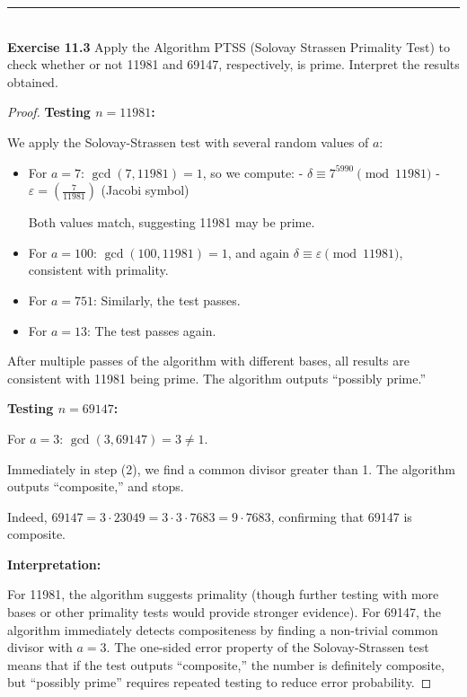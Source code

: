 \documentclass[a4paper]{article}
\begin{document}
\noindent\rule{12cm}{0.4pt}\\
\noindent \textbf{Exercise 11.3} Apply the Algorithm PTSS (Solovay Strassen Primality Test) to check whether or not 11981 and 69147, respectively, is prime. Interpret the results obtained.
\begin{proof}
\textbf{Testing $n = 11981$:}

We apply the Solovay-Strassen test with several random values of $a$:

\begin{itemize}
\item For $a = 7$: $\gcd(7, 11981) = 1$, so we compute:
  - $\delta \equiv 7^{5990} \pmod{11981}$
  - $\varepsilon = \left(\frac{7}{11981}\right)$ (Jacobi symbol)
  
  Both values match, suggesting 11981 may be prime.

\item For $a = 100$: $\gcd(100, 11981) = 1$, and again $\delta \equiv \varepsilon \pmod{11981}$, consistent with primality.

\item For $a = 751$: Similarly, the test passes.

\item For $a = 13$: The test passes again.
\end{itemize}

After multiple passes of the algorithm with different bases, all results are consistent with 11981 being prime. The algorithm outputs ``possibly prime.''

\textbf{Testing $n = 69147$:}

For $a = 3$: $\gcd(3, 69147) = 3 \neq 1$. 

Immediately in step (2), we find a common divisor greater than 1. The algorithm outputs ``composite,'' and stops.

Indeed, $69147 = 3 \cdot 23049 = 3 \cdot 3 \cdot 7683 = 9 \cdot 7683$, confirming that 69147 is composite.

\textbf{Interpretation:}

For 11981, the algorithm suggests primality (though further testing with more bases or other primality tests would provide stronger evidence). For 69147, the algorithm immediately detects compositeness by finding a non-trivial common divisor with $a = 3$. The one-sided error property of the Solovay-Strassen test means that if the test outputs ``composite,'' the number is definitely composite, but ``possibly prime'' requires repeated testing to reduce error probability.
\end{proof}
\end{document}
